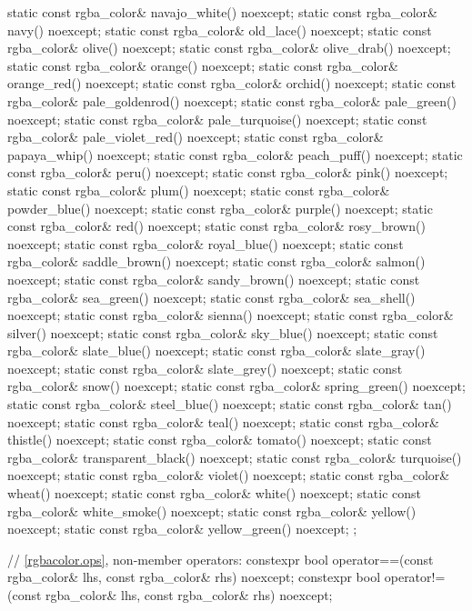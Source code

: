 \begin{codeblock}
{{    static const rgba_color& navajo_white() noexcept;
    static const rgba_color& navy() noexcept;
    static const rgba_color& old_lace() noexcept;
    static const rgba_color& olive() noexcept;
    static const rgba_color& olive_drab() noexcept;
    static const rgba_color& orange() noexcept;
    static const rgba_color& orange_red() noexcept;
    static const rgba_color& orchid() noexcept;
    static const rgba_color& pale_goldenrod() noexcept;
    static const rgba_color& pale_green() noexcept;
    static const rgba_color& pale_turquoise() noexcept;
    static const rgba_color& pale_violet_red() noexcept;
    static const rgba_color& papaya_whip() noexcept;
    static const rgba_color& peach_puff() noexcept;
    static const rgba_color& peru() noexcept;
    static const rgba_color& pink() noexcept;
    static const rgba_color& plum() noexcept;
    static const rgba_color& powder_blue() noexcept;
    static const rgba_color& purple() noexcept;
    static const rgba_color& red() noexcept;
    static const rgba_color& rosy_brown() noexcept;
    static const rgba_color& royal_blue() noexcept;
    static const rgba_color& saddle_brown() noexcept;
    static const rgba_color& salmon() noexcept;
    static const rgba_color& sandy_brown() noexcept;
    static const rgba_color& sea_green() noexcept;
    static const rgba_color& sea_shell() noexcept;
    static const rgba_color& sienna() noexcept;
    static const rgba_color& silver() noexcept;
    static const rgba_color& sky_blue() noexcept;
    static const rgba_color& slate_blue() noexcept;
    static const rgba_color& slate_gray() noexcept;
    static const rgba_color& slate_grey() noexcept;
    static const rgba_color& snow() noexcept;
    static const rgba_color& spring_green() noexcept;
    static const rgba_color& steel_blue() noexcept;
    static const rgba_color& tan() noexcept;
    static const rgba_color& teal() noexcept;
    static const rgba_color& thistle() noexcept;
    static const rgba_color& tomato() noexcept;
    static const rgba_color& transparent_black() noexcept;
    static const rgba_color& turquoise() noexcept;
    static const rgba_color& violet() noexcept;
    static const rgba_color& wheat() noexcept;
    static const rgba_color& white() noexcept;
    static const rgba_color& white_smoke() noexcept;
    static const rgba_color& yellow() noexcept;
    static const rgba_color& yellow_green() noexcept;
  };

  // \ref{rgbacolor.ops}, non-member operators:
  constexpr bool operator==(const rgba_color& lhs, const rgba_color& rhs) 
    noexcept;
  constexpr bool operator!=(const rgba_color& lhs, const rgba_color& rhs) 
    noexcept;
}
\end{codeblock}

